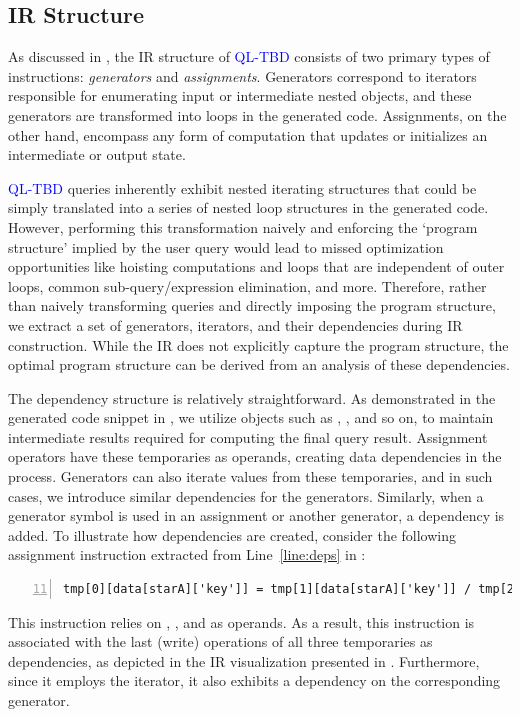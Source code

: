 \documentclass[runningheads]{llncs}
\newcommand{\lang}{\textcolor{blue}{QL-TBD}}
\begin{document}
\subsection{IR Structure}
As discussed in , the IR structure of \lang{} consists of two
primary types of instructions: \emph{generators} and \emph{assignments}.
Generators correspond to iterators responsible for enumerating input or intermediate
nested objects, and these generators are transformed into loops in the generated code.
Assignments, on the other hand, encompass any form of computation that updates or
initializes an intermediate or output state.

\lang{} queries inherently exhibit nested iterating structures that could be simply
translated into a series of nested loop structures in the generated code.
However, performing this transformation naively and enforcing the `program structure'
implied by the user query would lead to missed optimization opportunities like
hoisting computations and loops that are independent of outer loops,
common sub-query/expression elimination, and more.
Therefore, rather than naively transforming queries and directly imposing the program
structure, we extract a set of generators, iterators, and their dependencies during
IR construction.
While the IR does not explicitly capture the program structure, the optimal program
structure can be derived from an analysis of these dependencies.

The dependency structure is relatively straightforward.
As demonstrated in the generated code snippet in , we utilize objects such
as , , and so on, to maintain intermediate results required
for computing the final query result.
Assignment operators have these temporaries as operands, creating data dependencies in the
process.
Generators can also iterate values from these temporaries, and in such cases, we introduce
similar dependencies for the generators.
Similarly, when a generator symbol is used in an assignment or another generator, a
dependency is added.
To illustrate how dependencies are created, consider the following assignment instruction
extracted from Line~\ref{line:deps} in :

\begin{lstlisting}[style=JavaScript, columns=flexible, numbers=left, firstnumber=11]
tmp[0][data[starA]['key']] = tmp[1][data[starA]['key']] / tmp[2]
\end{lstlisting}

This instruction relies on , , and  as operands.
As a result, this instruction is associated with the last (write) operations of all three
temporaries as dependencies, as depicted in the IR visualization presented in .
Furthermore, since it employs the  iterator, it also exhibits a dependency on the
corresponding generator.
\end{document}
